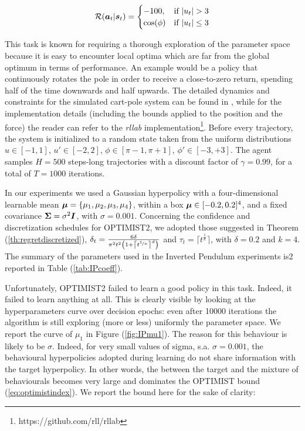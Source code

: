 \begin{equation}
\Rew(\boldsymbol{a}_t|\boldsymbol{s}_t)= \begin{cases}-100, &\text{if $|u_t|>3$} \\ \cos(\phi) &\text{if $|u_t|\leq3$} \end{cases}
\end{equation}

This task is known for requiring a thorough exploration of the parameter space because it is easy to encounter local optima which are far from the global optimum in terms of performance. An example would be a policy that continuously rotates the pole in order to receive a close-to-zero return, spending half of the time downwards and half upwards. The detailed dynamics and constraints for the simulated cart-pole system can be found in \cite{kimura1999efficient}, while for the implementation details (including the bounds applied to the position and the force) the reader can refer to the \emph{rllab} implementation\footnote{https://github.com/rll/rllab}. Before every trajectory, the system is initialized to a random state taken from the uniform distributions $u\in[-1,1]$, $u'\in[-2,2]$, $\phi\in[\pi-1,\pi+1]$, $\phi'\in[-3,+3]$. The agent samples $H=500$ steps-long trajectories with a discount factor of $\gamma=0.99$, for a total of $T=1000$ iterations.

In our experiments we used a Gaussian hyperpolicy with a four-dimensional learnable mean $\boldsymbol{\mu}=\{\mu_1, \mu_2, \mu_3, \mu_4\}$, within a box $\boldsymbol{\mu}\in[-0.2,0.2]^4$, and a fixed covariance $\boldsymbol{\Sigma}=\sigma^2\boldsymbol{I}$, with $\sigma=0.001$. Concerning the confidence and discretization schedules for \gls{OPTIMIST}2, we adopted those suggested in Theorem (\ref{th:regretdiscretized}), \ie ${\delta_t = \frac{6\delta}{\pi^2t^2\left(1+\left\lceil t^{\nicefrac{1}{\kappa}}\right\rceil^d\right)}}$ and $\tau_t=\lceil t^{\frac{1}{\kappa}} \rceil$, with $\delta=0.2$ and $k=4$. The summary of the parameters used in the Inverted Pendulum experiments is2 reported in Table (\ref{tab:IPcoeff}).

Unfortunately, \gls{OPTIMIST}2 failed to learn a good policy in this task.  Indeed, it failed to learn anything at all. This is clearly visible by looking at the hyperparameters curve over decision epochs: even after 10000 iterations the algorithm is still exploring (more or less) uniformly the parameter space. We report the curve of $\mu_1$ in Figure (\ref{fig:IPmu1}). The reason for this behaviour is likely to be $\sigma$. Indeed, for very small values of sigma, s.a. $\sigma=0.001$, the behavioural hyperpolicies adopted during learning do not share information with the target hyperpolicy. In other words, the \Renyi between the target and the mixture of behaviourals becomes very large and dominates the \gls{OPTIMIST} bound (\ref{eq:optimistindex}). We report the bound here for the sake of clarity:

